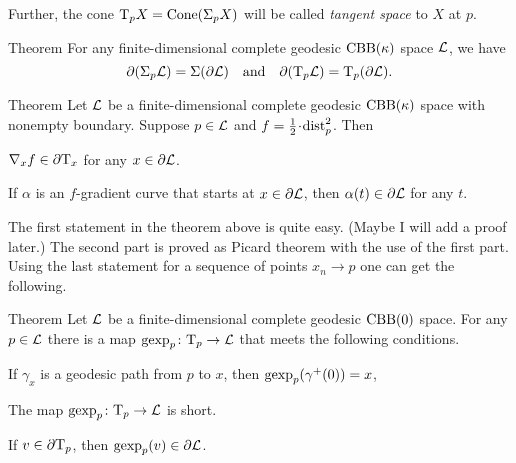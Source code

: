 Further, the cone $\mathrm{T}_pX=\mathop{\rm Cone}\nolimits(\Sigma_pX)$ will be called \emph{tangent space} to $X$ at $p$.

\begin{thm}{Theorem}\label{thm:partial-Sigma}
For any finite-dimensional complete geodesic $\mathrm{CBB}(\kappa)$ space $\mathcal{L}$, we have
\[\partial (\Sigma_p\mathcal{L})=\Sigma(\partial\mathcal{L})
\quad\text{and}\quad
\partial(\mathrm{T}_p\mathcal{L})=\mathrm{T}_p(\partial\mathcal{L}).\]
\end{thm}

\begin{thm}{Theorem}\label{thm:partial-grad}
Let $\mathcal{L}$ be a finite-dimensional complete geodesic $\mathrm{CBB}(\kappa)$ space with nonempty boundary.
Suppose $p\in \mathcal{L}$ and $f\z=\tfrac12\cdot\distfun_p^2$.
Then

\begin{subthm}{}
$\nabla_xf\in \partial\mathrm{T}_x$ for any $x\in\partial \mathcal{L}$.
\end{subthm}

\begin{subthm}{}
If $\alpha$ is an $f$-gradient curve that starts at $x\in \partial \mathcal{L}$, then $\alpha(t)\in \partial \mathcal{L}$ for any $t$.
\end{subthm}

\end{thm}

The first statement in the theorem above is quite easy.
(Maybe I will add a proof later.)
The second part is proved as Picard theorem with the use of the first part.
Using the last statement for a sequence of points $x_n\to p$ one can get the following.

\begin{thm}{Theorem}\label{thm:gexp}
Let $\mathcal{L}$ be a finite-dimensional complete geodesic $\mathrm{CBB}(0)$ space.
For any $p\in \mathcal{L}$ there is a map $\operatorname{\rm gexp}\nolimits_p\colon\mathrm{T}_p\to \mathcal{L}$  that meets the following conditions.

\begin{subthm}{}
If $\gamma_x$ is a geodesic path from $p$ to $x$, then $\operatorname{\rm gexp}\nolimits_p(\gamma^+(0))=x$, 
\end{subthm}

\begin{subthm}{}
The map $\operatorname{\rm gexp}\nolimits_p\colon\mathrm{T}_p\to \mathcal{L}$ is short.
\end{subthm}

\begin{subthm}{}
If $v\in \partial\mathrm{T}_p$, then $\operatorname{\rm gexp}\nolimits_p(v)\in \partial  \mathcal{L}$.
\end{subthm}

\end{thm}


